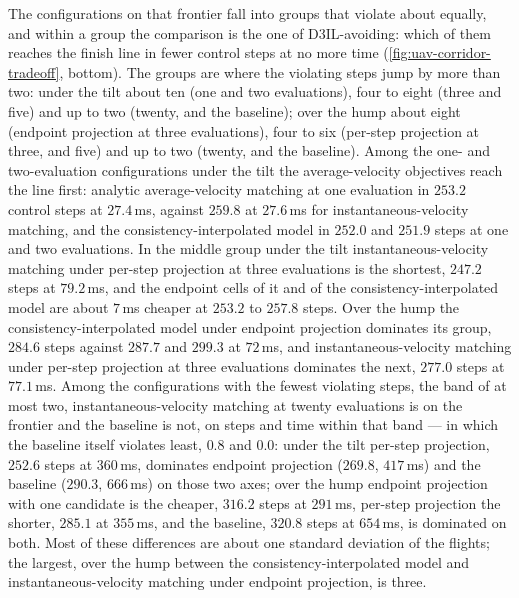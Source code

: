 The configurations on that frontier fall into groups that violate about equally, and within a group the
comparison is the one of D3IL-avoiding: which of them reaches the finish line in fewer control steps at no
more time (\autoref{fig:uav-corridor-tradeoff}, bottom). The groups are where the violating steps jump by
more than two: under the tilt about ten (one and two evaluations), four to eight (three and five) and up
to two (twenty, and the baseline); over the hump about eight (endpoint projection at three evaluations), four
to six (per-step projection at three, and five) and up to two (twenty, and the baseline). Among the one- and
two-evaluation configurations under the tilt the average-velocity objectives reach the line first: analytic
average-velocity matching at one evaluation in $253.2$ control steps at $27.4$\,ms, against $259.8$ at
$27.6$\,ms for instantaneous-velocity matching, and the consistency-interpolated model in $252.0$ and $251.9$
steps at one and two evaluations. In the middle group under the tilt instantaneous-velocity matching under
per-step projection at three evaluations is the shortest, $247.2$ steps at $79.2$\,ms, and the endpoint
cells of it and of the consistency-interpolated model are about $7$\,ms cheaper at $253.2$ to $257.8$ steps.
Over the hump the consistency-interpolated model under endpoint projection dominates its group, $284.6$ steps
against $287.7$ and $299.3$ at $72$\,ms, and instantaneous-velocity matching under per-step projection at
three evaluations dominates the next, $277.0$ steps at $77.1$\,ms. Among the configurations with the fewest
violating steps, the band of at most two, instantaneous-velocity matching at twenty evaluations is on the
frontier and the baseline is not, on steps and time within that band --- in which the baseline itself
violates least, $0.8$ and $0.0$: under the tilt per-step projection, $252.6$ steps at $360$\,ms, dominates
endpoint projection ($269.8$, $417$\,ms) and the baseline ($290.3$, $666$\,ms) on those two axes; over the
hump endpoint projection with one candidate is the cheaper, $316.2$ steps at $291$\,ms, per-step projection
the shorter, $285.1$ at $355$\,ms, and the baseline, $320.8$ steps at $654$\,ms, is dominated on both. Most of these differences are about one standard deviation of the
flights; the largest, over the hump between the consistency-interpolated model and instantaneous-velocity
matching under endpoint projection, is three.

